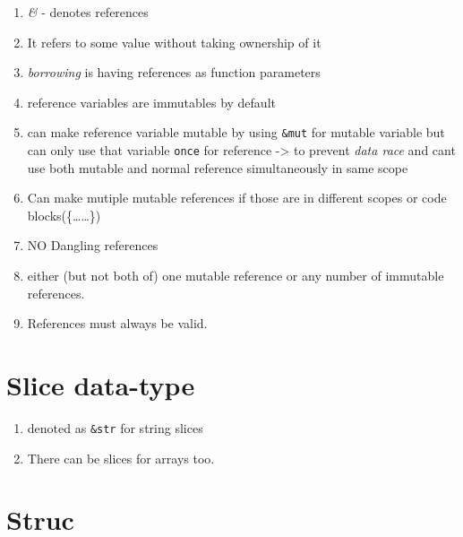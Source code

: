 \documentclass[11pt]{article}
\begin{document}
\begin{enumerate}
\item \emph{\&} - denotes references

\item It  refers to some value without taking ownership of it

\item \emph{borrowing} is having references as function parameters

\item reference variables are immutables by default

\item can make reference variable mutable by using \verb~&mut~ for mutable variable
but can only use that variable \verb~once~ for reference -> to prevent  \emph{data race}
and cant use both mutable and normal reference simultaneously in same scope

\item Can make mutiple mutable references if those are in different scopes or code blocks(\{\ldots{}\ldots{}\})

\item NO Dangling references

\item either (but not both of) one mutable reference or any number of immutable references.

\item References must always be valid.
\end{enumerate}


\section{Slice data-type}
\label{sec-7}

\begin{enumerate}
\item denoted as \verb~&str~  for string slices

\item There can be slices for arrays too.
\end{enumerate}


\section{Struc}
\label{sec-8}
\end{document}
